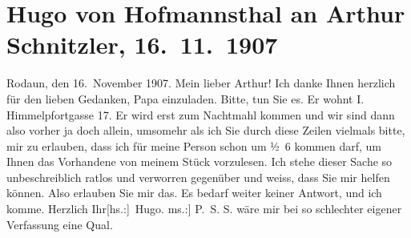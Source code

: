 

         
         \newcommand{\erwaehntePersonen}{Personen: Hugo August von Hofmannsthal, Gustav Schwarzkopf}
         \newcommand{\erwaehnteInstitutionen}{}
         \newcommand{\erwaehnteOrte}{Orte: Himmelpfortgasse, Rodaun, Wien}
         \newcommand{\erwaehnteWerke}{Werke: Silvia im »Stern«}
               \section[Hugo von Hofmannsthal an Arthur Schnitzler, 16. 11. 1907]{ Hugo von Hofmannsthal an Arthur Schnitzler, 16. 11. 1907}\nopagebreak{}\rehead{ }\begin{ledgroupsized}[t]{13cm}\normalsize\beginnumbering \toendnotes[C]{\smallbreak\pagebreak[2]} 
\toendnotes[C]{\smallbreak}\pstart
           \raggedleft{}{\pb}Rodaun, den 16. November
                  1907.\pend
           \pstart{}Mein lieber Arthur!\pend\pstart
           Ich danke Ihnen herzlich für den lieben Gedanken, Papa einzuladen. Bitte, tun Sie es. Er wohnt I. Himmelpfortgasse 17. Er wird erst zum Nachtmahl
               kommen und wir sind dann also vorher ja doch allein, umsomehr als ich Sie durch
               diese Zeilen vielmals bitte, mir zu erlauben, dass ich für meine Person schon um
                  ½ 6 kommen darf, um Ihnen das Vorhandene von meinem Stück vorzulesen. Ich stehe dieser Sache so
               unbeschreiblich ratlos und verworren gegenüber und weiss, dass Sie mir helfen
               können. Also erlauben Sie mir das. Es bedarf weiter keiner Antwort, und ich
               komme.\pend
           \pstart Herzlich Ihr\spacefill\mbox{{[}hs.:{]}  Hugo.}\pend{}\pstart
           \noindent{}{[}ms.:{]} P. S. S. wäre mir bei so schlechter eigener
                  Verfassung eine Qual.\pend
           
         
         \endnumbering{}\end{ledgroupsized}  \newcommand{\dateiname}{L01732}\newcommand{\titel}{Hugo von Hofmannsthal an Arthur Schnitzler, 16. 11. 1907}\newcommand{\editorInnen}{Martin Anton Müller und Gerd-Hermann Susen}
      